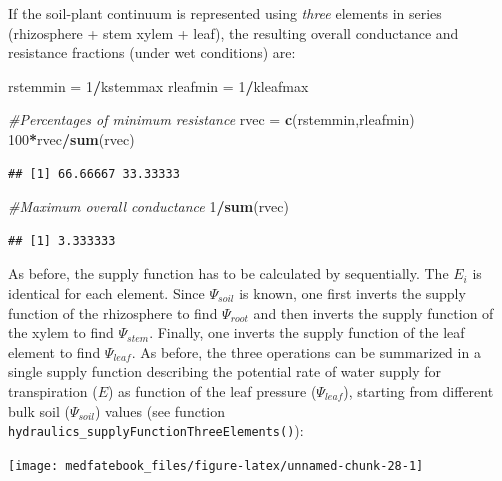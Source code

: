 \documentclass[]{book}
\newenvironment{Shaded}{\begin{snugshade}}{\end{snugshade}}
\newcommand{\KeywordTok}[1]{\textcolor[rgb]{0.13,0.29,0.53}{\textbf{#1}}}
\newcommand{\DecValTok}[1]{\textcolor[rgb]{0.00,0.00,0.81}{#1}}
\newcommand{\StringTok}[1]{\textcolor[rgb]{0.31,0.60,0.02}{#1}}
\newcommand{\CommentTok}[1]{\textcolor[rgb]{0.56,0.35,0.01}{\textit{#1}}}
\newcommand{\OperatorTok}[1]{\textcolor[rgb]{0.81,0.36,0.00}{\textbf{#1}}}
\newcommand{\NormalTok}[1]{#1}
\begin{document}
If the soil-plant continuum is represented using \emph{three} elements in series (rhizosphere + stem xylem + leaf), the resulting overall conductance and resistance fractions (under wet conditions) are:

\begin{Shaded}
\begin{Highlighting}[]
\NormalTok{rstemmin =}\StringTok{ }\DecValTok{1}\OperatorTok{/}\NormalTok{kstemmax}
\NormalTok{rleafmin =}\StringTok{ }\DecValTok{1}\OperatorTok{/}\NormalTok{kleafmax}

\CommentTok{#Percentages of minimum resistance}
\NormalTok{rvec =}\StringTok{ }\KeywordTok{c}\NormalTok{(rstemmin,rleafmin)}
\DecValTok{100}\OperatorTok{*}\NormalTok{rvec}\OperatorTok{/}\KeywordTok{sum}\NormalTok{(rvec)}
\end{Highlighting}
\end{Shaded}

\begin{verbatim}
## [1] 66.66667 33.33333
\end{verbatim}

\begin{Shaded}
\begin{Highlighting}[]
\CommentTok{#Maximum overall conductance}
\DecValTok{1}\OperatorTok{/}\KeywordTok{sum}\NormalTok{(rvec)}
\end{Highlighting}
\end{Shaded}

\begin{verbatim}
## [1] 3.333333
\end{verbatim}

As before, the supply function has to be calculated by sequentially. The \(E_i\) is identical for each element. Since \(\Psi_{soil}\) is known, one first inverts the supply function of the rhizosphere to find \(\Psi_{root}\) and then inverts the supply function of the xylem to find \(\Psi_{stem}\). Finally, one inverts the supply function of the leaf element to find \(\Psi_{leaf}\). As before, the three operations can be summarized in a single supply function describing the potential rate of water supply for transpiration (\(E\)) as function of the leaf pressure (\(\Psi_{leaf}\)), starting from different bulk soil (\(\Psi_{soil}\)) values (see function \texttt{hydraulics\_supplyFunctionThreeElements()}):

\begin{center}\texttt{[image: medfatebook\_files/figure-latex/unnamed-chunk-28-1]} \end{center}
\end{document}
